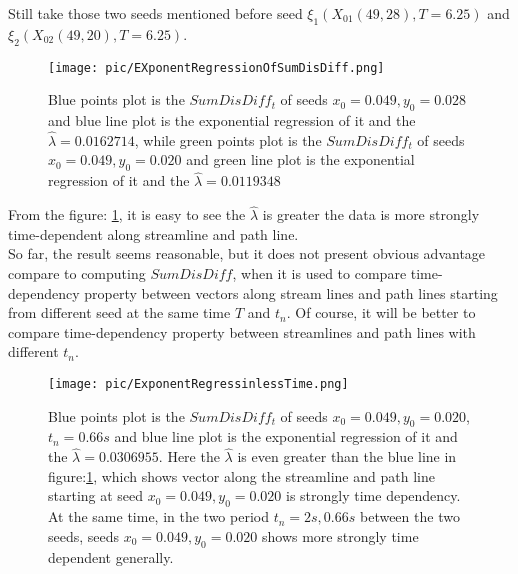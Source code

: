 \documentclass[
     11pt,         %
     a4paper,      %
     oneside,
     ]{article}
\begin{document}
Still take those two seeds mentioned before seed $\xi_{1}(X_{01}(49,28),T=6.25)$ and $\xi_{2}(X_{02}(49,20),T=6.25)$.
\begin{figure}[H]
	\centering
	\texttt{[image: pic/EXponentRegressionOfSumDisDiff.png]}
	\caption{ Blue points plot is the $SumDisDiff_{t}$ of seeds $x_{0}=0.049, y_{0}=0.028$ and blue line plot is the exponential regression of it and the $\hat{\lambda}=0.0162714$, while green points plot is the $SumDisDiff_{t}$ of seeds $x_{0}=0.049, y_{0}=0.020$ and green line plot is the exponential regression of it and the $\hat{\lambda}=0.0119348$}
	\label{fig:ExponentRegressionPlot}
\end{figure}
From the figure: \ref{fig:ExponentRegressionPlot}, it is easy to see the $\hat{\lambda}$ is greater the data is more strongly time-dependent along streamline and path line.\\
So far, the result seems reasonable, but it does not present obvious advantage compare to computing $SumDisDiff$, when it is used to compare time-dependency property between vectors along stream lines and path lines starting from different seed at the same time $T$ and $t_{n}$. Of course, it will be better to compare time-dependency property between streamlines and path lines with different $t_{n}$.
\begin{figure}[H]
	\centering
	\texttt{[image: pic/ExponentRegressinlessTime.png]}
	\caption{ Blue points plot is the $SumDisDiff_{t}$ of seeds $x_{0}=0.049, y_{0}=0.020$, $t_{n}=0.66s$ and blue line plot is the exponential regression of it and the $\hat{\lambda}=0.0306955$. Here the $\hat{\lambda}$ is even greater than the blue line in figure:\ref{fig:ExponentRegressionPlot}, which shows vector along the streamline and path line starting at seed  $x_{0}=0.049, y_{0}=0.020$ is strongly time dependency. At the same time, in the two period $t_{n}=2s , 0.66s$ between the two seeds, seeds $x_{0}=0.049, y_{0}=0.020$ shows more strongly time dependent generally. }
	\label{fig:ExponentRegressinlessTime}
\end{figure}
\end{document}
